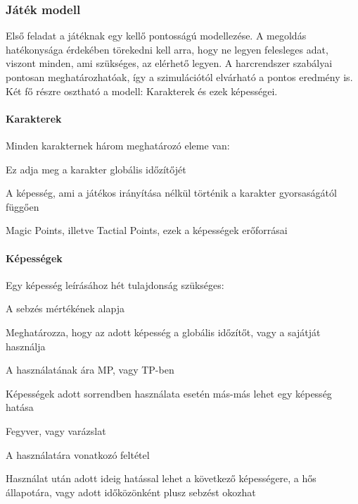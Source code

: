 \documentclass[12pt]{article}
\begin{document}
\subsubsection{Játék modell}

Első feladat a játéknak egy kellő pontosságú modellezése. A megoldás hatékonysága érdekében törekedni kell arra, hogy ne legyen felesleges adat, viszont minden, ami szükséges, az elérhető legyen. 
A harcrendszer szabályai pontosan meghatározhatóak, így a szimulációtól elvárható a pontos eredmény is. 
Két fő részre osztható a modell: Karakterek és ezek képességei.

\paragraph{Karakterek}

Minden karakternek három meghatározó eleme van:

\begin{description}[align=right,labelwidth=3cm]
	\item [Gyorsaság] Ez adja meg a karakter globális időzítőjét
	\item [Támadás] A képesség, ami a játékos irányítása nélkül történik a karakter gyorsaságától függően
	\item [MP/TP] Magic Points, illetve Tactial Points, ezek a képességek erőforrásai
\end{description}

\paragraph{Képességek}

Egy képesség leírásához hét tulajdonság szükséges:

\begin{description}[align=right,labelwidth=3cm]
	\item [Potenciál] A sebzés mértékének alapja
	\item [Időzítő] Meghatározza, hogy az adott képesség a globális időzítőt, vagy a sajátját használja
	\item [Erőforrás] A használatának ára MP, vagy TP-ben
	\item [Combo] Képességek adott sorrendben használata esetén más-más lehet egy képesség hatása
	\item [Típus] Fegyver, vagy varázslat
	\item [Feltétel] A használatára vonatkozó feltétel
	\item [Hatás] Használat után adott ideig hatással lehet a következő képességere, a hős állapotára, vagy adott időközönként plusz sebzést okozhat
\end{description}
\end{document}
